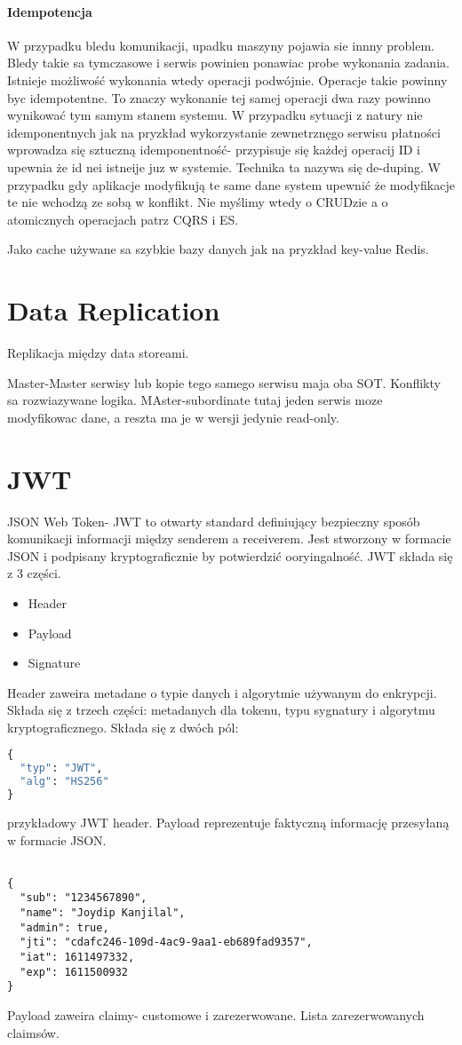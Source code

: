 \documentclass{article}
\begin{document}
\paragraph{Idempotencja}
W przypadku bledu komunikacji, upadku maszyny pojawia sie innny problem. Bledy takie sa tymczasowe i serwis powinien ponawiac probe wykonania zadania.
Istnieje możliwość wykonania wtedy operacji podwójnie. Operacje takie powinny byc idempotentne. To znaczy wykonanie tej samej operacji
dwa razy powinno wynikować tym samym stanem systemu. W przypadku sytuacji z natury nie idemponentnych jak na pryzkład wykorzystanie
zewnetrznęgo serwisu płatności wprowadza się sztuczną idemponentność- przypisuje się każdej operacij ID i upewnia że id nei istneije juz w systemie.
Technika ta nazywa się de-duping.
W przypadku gdy aplikacje modyfikują te same dane system upewnić że modyfikacje te nie wchodzą ze sobą w konflikt.
Nie myślimy wtedy o CRUDzie a o atomicznych operacjach patrz CQRS i ES. 


Jako cache używane sa szybkie bazy danych jak na pryzkład key-value Redis.

\section{Data Replication}
Replikacja między data storeami.

Master-Master
serwisy lub kopie tego samego serwisu maja oba SOT. Konflikty sa rozwiazywane logika.
MAster-subordinate tutaj jeden serwis moze modyfikowac dane, a reszta ma je w wersji jedynie read-only.



\section{JWT}
JSON Web Token- JWT to otwarty standard definiujący bezpieczny sposób komunikacji informacji między senderem a receiverem.
Jest stworzony w formacie JSON i podpisany kryptograficznie by potwierdzić ooryingalność.
JWT składa się z 3 części.
\begin{itemize}
    \item Header
    \item Payload
    \item Signature
\end{itemize}
Header zaweira metadane o typie danych i algorytmie używanym do enkrypcji. Składa się z trzech części: metadanych dla tokenu,
typu sygnatury i algorytmu kryptograficznego. Składa się z dwóch pól:
\begin{lstlisting}[language=Python]
{
  "typ": "JWT",
  "alg": "HS256"
}
\end{lstlisting}
przykładowy JWT header.
Payload reprezentuje faktyczną informację przesyłaną w formacie JSON.
    \begin{lstlisting}
      
{
  "sub": "1234567890",
  "name": "Joydip Kanjilal",
  "admin": true,
  "jti": "cdafc246-109d-4ac9-9aa1-eb689fad9357",
  "iat": 1611497332,
  "exp": 1611500932
}
    \end{lstlisting}
Payload zaweira claimy- customowe i zarezerwowane. Lista zarezerwowanych claimsów.
\end{document}
